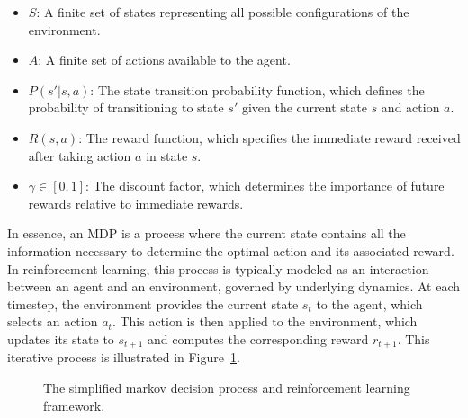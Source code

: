 \documentclass[runningheads]{llncs}
\begin{document}
\begin{itemize}
    \item $S$: A finite set of states representing all possible configurations of the environment.
    \item $A$: A finite set of actions available to the agent.
    \item $P(s'|s, a)$: The state transition probability function, which defines the probability of transitioning to state $s'$ given the current state $s$ and action $a$.
    \item $R(s, a)$: The reward function, which specifies the immediate reward received after taking action $a$ in state $s$.
    \item $\gamma \in [0, 1]$: The discount factor, which determines the importance of future rewards relative to immediate rewards.
\end{itemize}

In essence, an MDP is a process where the current state contains all the information necessary to determine the optimal action and its associated reward. 
In reinforcement learning, this process is typically modeled as an interaction between an agent and an environment, governed by underlying dynamics. 
At each timestep, the environment provides the current state $s_t$ to the agent, which selects an action $a_t$. 
This action is then applied to the environment, which updates its state to $s_{t+1}$ and computes the corresponding reward $r_{t+1}$. 
This iterative process is illustrated in Figure~\ref{fig:rl_framework}.

\begin{figure}
    \centering
    \caption{The simplified markov decision process and reinforcement learning framework.}
    \label{fig:rl_framework}
\end{figure}
\end{document}
